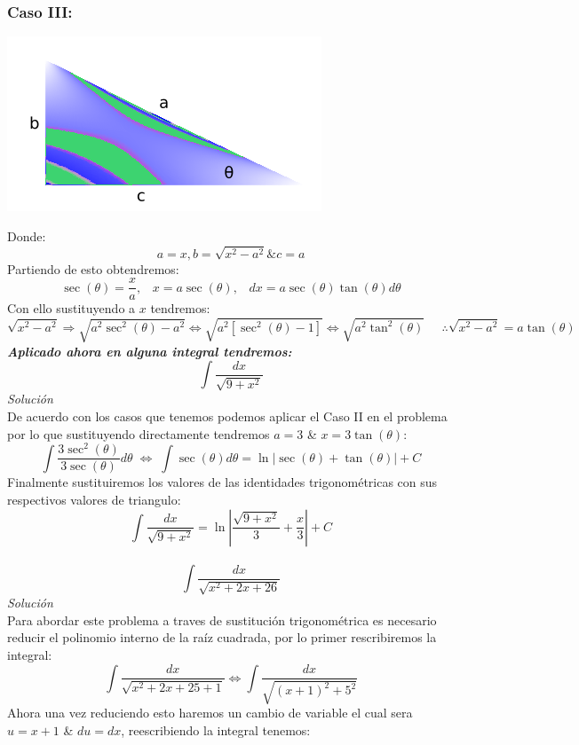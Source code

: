 \documentclass[10pt,executivepaper]{article}
\begin{document}
\subsubsection{Caso III:}
\begin{center}
  \includegraphics[scale=0.5]{imgsAux/triangulo2.png}\\
\end{center}
Donde:
\[a=x, b=\sqrt{x^{2}-a^{2}} \& c=a\]
Partiendo de esto obtendremos:
\[\sec(\theta)= \frac{x}{a},\;\;\; x=a\sec(\theta),\;\;\; dx=a\sec(\theta)\tan(\theta)d\theta\]
Con ello sustituyendo a $x$ tendremos:
\[\sqrt{x^{2}-a^{2}}\Rightarrow \sqrt{a^{2}\sec^{2}(\theta)-a^{2}} \Leftrightarrow \sqrt{a^{2}[\sec^{2}(\theta)-1]} \Leftrightarrow \sqrt{a^{2}\tan^{2}(\theta)}\;\;\;\;\; \therefore \sqrt{x^{2}-a^{2}}=a\tan(\theta)\]
\textit{\textbf{Aplicado ahora en alguna integral tendremos:}}\\
\[\int \frac{dx}{\sqrt{9+x^{2}}}\]
\textit{Solución}\\
De acuerdo con los casos que tenemos podemos aplicar el Caso II en el problema por lo que sustituyendo directamente tendremos $a=3$ \& $x=3\tan(\theta)$:
\[\int \frac{3\sec^{2}(\theta)}{3\sec(\theta)}d\theta \; \Leftrightarrow \; \int \sec(\theta)d\theta = \ln\left|\sec(\theta)+\tan(\theta)\right|+C\]
Finalmente sustituiremos los valores de las identidades trigonométricas con sus respectivos valores de triangulo:
\[\int \frac{dx}{\sqrt{9+x^{2}}}= \ln\left|\frac{\sqrt{9+x^{2}}}{3}+\frac{x}{3}\right|+C\]
\\\vspace{0.5cm}
\[\int\frac{dx}{\sqrt{x^{2}+2x+26}}\]
\textit{Solución}\\
Para abordar este problema a traves de sustitución trigonométrica es necesario reducir el polinomio interno de la raíz cuadrada, por lo primer rescribiremos la integral:
\[\int \frac{dx}{\sqrt{x^{2}+2x+25+1}}\Leftrightarrow \int \frac{dx}{\sqrt{(x+1)^{2}+5^{2}}}\]
Ahora una vez reduciendo esto haremos un cambio de variable el cual sera $u=x+1$ \& $du=dx$, reescribiendo la integral tenemos:
\end{document}
